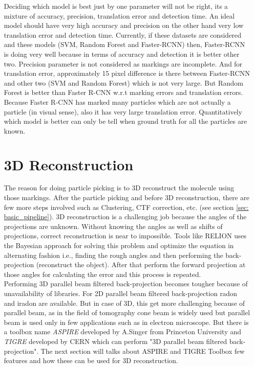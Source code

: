 \documentclass{report}
\begin{document}
Deciding which model is best just by one parameter will not be right, its a mixture of accuracy, precision, translation error and detection time. An ideal model should have very high accuracy and precision on the other hand very low translation error and detection time. Currently, if these datasets are considered and these models (SVM, Random Forest and Faster-RCNN) then, Faster-RCNN is doing very well because in terms of accuracy and detection it is better other two. Precision parameter is not considered as markings are incomplete. And for translation error, approximately 15 pixel difference is there between Faster-RCNN and other two (SVM and Random Forest) which is not very large. But Random Forest is better than Faster R-CNN w.r.t marking errors and translation errors. Because Faster R-CNN has marked many particles which are not actually a particle (in visual sense), also it has very large translation error. Quantitatively which model is better can only be tell when ground truth for all the particles are known. 


\chapter{3D Reconstruction}
The reason for doing particle picking is to 3D reconstruct the molecule using those markings. After the particle picking and before 3D reconstruction, there are few more steps involved such as Clustering, CTF correction, etc. (see section \ref{sec: basic_pipeline}). 3D reconstruction is a challenging job because the angles of the projections are unknown. Without knowing the angles as well as shifts of projections, correct reconstruction is near to impossible. Tools like RELION uses the Bayesian \cite{scheres2012relion} approach for solving this problem and optimize the equation in alternating fashion i.e., finding the rough angles and then performing the back-projection (reconstruct the object). After that perform the forward projection at those angles for calculating the error and this process is repeated. \\

Performing 3D parallel beam filtered back-projection becomes tougher because of unavailability of libraries. For 2D parallel beam filtered back-projection radon and iradon are available. But in case of 3D, this get more challenging because of parallel beam, as in the field of tomography cone beam is widely used but parallel beam is used only in few applications such as in electron microscope. But there is a toolbox name \textit{ASPIRE} developed by A.Singer from Princeton University and \textit{TIGRE} developed by CERN which can perform "3D parallel beam filtered back-projection". The next section will talks about ASPIRE and TIGRE Toolbox few features and how these can be used for 3D reconstruction.
\end{document}
